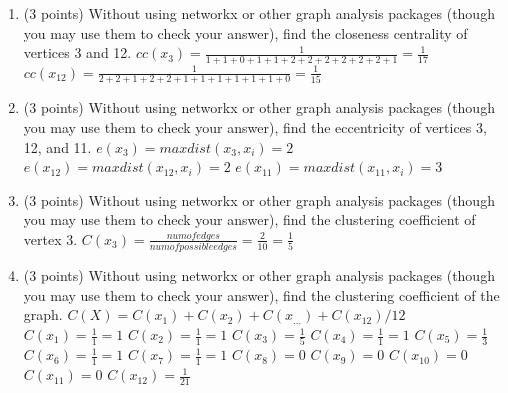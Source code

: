 \documentclass[11pt]{article}
\begin{document}
\begin{enumerate}

    \item (3 points) Without using networkx or other graph analysis packages
    (though you may use them to check your answer), find the closeness
    centrality of vertices 3 and 12.
    \newline $cc(x_3) = \frac{1}{1+1+0+1+1+2+2+2+2+2+2+1} = \frac{1}{17}$
    \newline $cc(x_{12}) = \frac{1}{2+2+1+2+2+1+1+1+1+1+1+0} = \frac{1}{15}$

    \item (3 points) Without using networkx or other graph analysis packages
    (though you may use them to check your answer), find the eccentricity of
    vertices 3, 12, and 11.
    \newline $e(x_3) = maxdist(x_3,x_i) = 2$
    \newline $e(x_{12}) = maxdist(x_{12},x_i) = 2$
    \newline $e(x_{11}) = maxdist(x_{11},x_i) = 3$
    \item (3 points) Without using networkx or other graph analysis packages
    (though you may use them to check your answer), find the clustering
    coefficient of vertex 3.
    \newline $C(x_3) = \frac{num of edges}{num of possible edges} = \frac{2}{10} = \frac{1}{5}$
    \item (3 points) Without using networkx or other graph analysis packages
    (though you may use them to check your answer), find the clustering
    coefficient of the graph.
    \newline $C(X) = C(x_1) + C(x_2) + C(x_{...}) + C(x_{12}) / 12$
    \newline $C(x_1) = \frac{1}{1} = 1$
    \newline $C(x_2) = \frac{1}{1} = 1$
    \newline $C(x_3) = \frac{1}{5}$
    \newline $C(x_4) = \frac{1}{1} = 1$
    \newline $C(x_5) = \frac{1}{3}$
    \newline $C(x_6) = \frac{1}{1} = 1$
    \newline $C(x_7) = \frac{1}{1} = 1$
    \newline $C(x_8) = 0$
    \newline $C(x_9) = 0$
    \newline $C(x_{10}) = 0$
    \newline $C(x_{11}) = 0$
    \newline $C(x_{12}) = \frac{1}{21}$

\end{enumerate}
\end{document}
